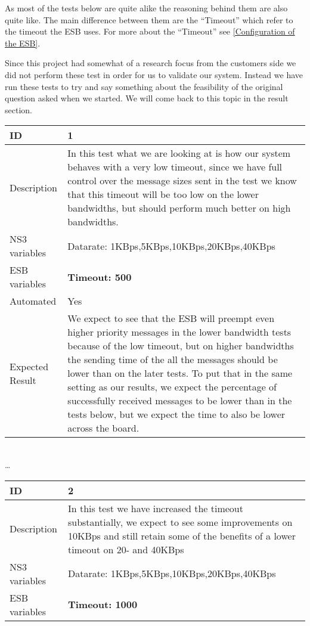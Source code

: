 	As most of the tests below are quite alike the reasoning behind them are also quite like. The main difference between them are the “Timeout” which refer to the timeout the ESB uses. For more about the “Timeout” see \ref{Configuration of the ESB}.

	Since this project had somewhat of a research focus from the customers side we did not perform these test in order for us to validate our system. Instead we have run these tests to try and say something about the feasibility of the original question asked when we started. We will come back to this topic in the result section.
\begin{center}
\begin{tabular}{| p{4cm} | p{8cm} |}%
\hline
ID & 1 \\
\hline
Description &  In this test what we are looking at is how our system behaves with a very low timeout, since we have full control over the message sizes sent in the test we know that this timeout will be too low on the lower bandwidths, but should perform much better on high bandwidths. \\
\hline
NS3 variables & Datarate: 1KBps,5KBps,10KBps,20KBps,40KBps \\
\hline
ESB variables & \textbf{Timeout: 500} \\
\hline
Automated & Yes \\
\hline
Expected Result & We expect to see that the ESB will preempt even higher priority messages in the lower bandwidth tests because of the low timeout, but on higher bandwidths the sending time of the all the messages should be lower than on the later tests. To put that in the same setting as our results, we expect the percentage of successfully received messages to be lower than in the tests below, but we expect the time to also be lower across the board.  \\
\hline
\end{tabular}
\\ \ldots \\
\begin{tabular}{| p{4cm} | p{8cm} |}%
\hline
ID & 2 \\
\hline
Description & In this test we have increased the timeout substantially, we expect to see some improvements on 10KBps and still retain some of the benefits of a lower timeout on 20- and 40KBps \\
\hline
NS3 variables & Datarate: 1KBps,5KBps,10KBps,20KBps,40KBps \\
\hline
ESB variables & \textbf{Timeout: 1000} \\

\end{tabular}
\end{center}
